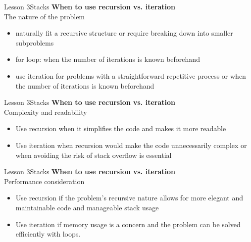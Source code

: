 \documentclass[aspectratio=1610]{beamer}
\begin{document}
\begin{frame}{Lesson 3}{Stacks}
\LARGE
\textbf{When to use recursion vs. iteration}\\
The nature of the problem
\begin{itemize}
    \item naturally fit a recursive structure or require breaking down into smaller subproblems
    \item for loop: when the number of iterations is known beforehand
    \item use iteration for problems with a straightforward repetitive process or when the number of iterations is known beforehand
\end{itemize}
\end{frame}


\begin{frame}{Lesson 3}{Stacks}
\LARGE
\textbf{When to use recursion vs. iteration}\\
Complexity and readability
\begin{itemize}
    \item Use recursion when it simplifies the code and makes it more readable
    \item Use iteration when recursion would make the code unnecessarily complex or when avoiding the risk of stack overflow is essential
\end{itemize}
\end{frame}



\begin{frame}{Lesson 3}{Stacks}
\LARGE
\textbf{When to use recursion vs. iteration}\\
Performance consideration
\begin{itemize}
    \item Use recursion if the problem’s recursive nature allows for more elegant and maintainable code and manageable stack usage
    \item Use iteration if memory usage is a concern and the problem can be solved efficiently with loops.
\end{itemize}
\end{frame}
\end{document}
